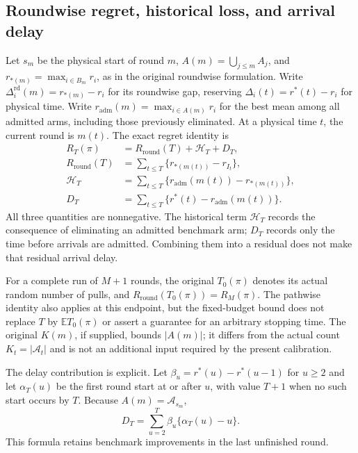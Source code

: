 \subsection{Roundwise regret, historical loss, and arrival delay}
\label{sec:ucbaa_three_contributions}

Let $s_m$ be the physical start of round $m$,
$A(m)=\bigcup_{j\le m}A_j$, and
$r_{*(m)}=\max_{i\in B_m}r_i$, as in the original roundwise formulation.
Write $\Delta_i^{\mathrm{rd}}(m)=r_{*(m)}-r_i$ for its roundwise gap,
reserving $\Delta_i(t)=r^*(t)-r_i$ for physical time.
Write $r_{\mathrm{adm}}(m)=\max_{i\in A(m)}r_i$ for the best mean
among all admitted arms, including those previously eliminated.
At a physical time $t$, the current round is $m(t)$. The exact regret
identity is
\begin{align}
 R_T(\pi)&=R_{\mathrm{round}}(T)+\mathcal H_T+D_T,\label{eq:ucbaa_main_decomposition}\\
 R_{\mathrm{round}}(T)
  &=\sum_{t\le T}\{r_{*(m(t))}-r_{I_t}\},\nonumber\\
 \mathcal H_T&=\sum_{t\le T}\{r_{\mathrm{adm}}(m(t))-r_{*(m(t))}\},\nonumber\\
 D_T&=\sum_{t\le T}\{r^*(t)-r_{\mathrm{adm}}(m(t))\}.\nonumber
\end{align}
All three quantities are nonnegative. The historical term $\mathcal H_T$ records
the consequence of eliminating an admitted benchmark arm; $D_T$ records
only the time before arrivals are admitted. Combining them into a residual
does not make that residual arrival delay.

For a complete run of $M+1$ rounds, the original $T_0(\pi)$ denotes its
actual random number of pulls, and
$R_{\mathrm{round}}(T_0(\pi))=R_M(\pi)$.
The pathwise identity also applies at this endpoint, but the fixed-budget
bound does not replace $T$ by $\mathbb E T_0(\pi)$ or assert a guarantee
for an arbitrary stopping time. The original $K(m)$, if supplied, bounds
$|A(m)|$; it differs from the actual count $K_t=|\mathcal A_t|$ and is
not an additional input required by the present calibration.

The delay contribution is explicit. Let
$\beta_u=r^*(u)-r^*(u-1)$ for $u\ge2$ and let $\alpha_T(u)$ be the
first round start at or after $u$, with value $T+1$ when no such start
occurs by $T$. Because $A(m)=\mathcal A_{s_m}$,
\begin{equation}
 D_T=\sum_{u=2}^T\beta_u\{\alpha_T(u)-u\}.
 \label{eq:ucbaa_main_delay}
\end{equation}
This formula retains benchmark improvements in the last unfinished round.


